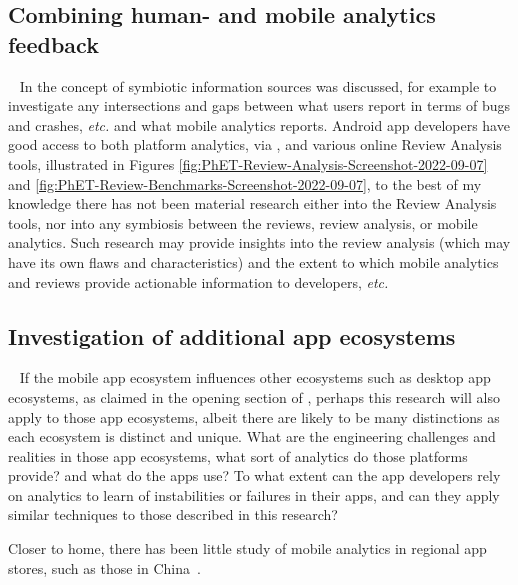 \subsection{Combining human- and mobile analytics feedback}~\label{fw-combining-reviews-and-mobile-analytics-topic}
In  the concept of symbiotic information sources was discussed, for example to investigate any intersections and gaps between what users report in terms of bugs and crashes, \emph{etc.} and what mobile analytics reports. Android app developers have good access to both platform analytics, via , and various online Review Analysis tools, illustrated in Figures \ref{fig:PhET-Review-Analysis-Screenshot-2022-09-07} and \ref{fig:PhET-Review-Benchmarks-Screenshot-2022-09-07}, to the best of my knowledge there has not been material research either into the Review Analysis tools, nor into any symbiosis between the reviews, review analysis, or mobile analytics. Such research may provide insights into the review analysis (which may have its own flaws and characteristics) and the extent to which mobile analytics and reviews provide actionable information to developers, \emph{etc.}


\subsection{Investigation of additional app ecosystems}~\label{fw-investigate-additional-ecosystems}
If the mobile app ecosystem influences other ecosystems such as desktop app ecosystems, as claimed in the opening section of , perhaps this research will also apply to those app ecosystems, albeit there are likely to be many distinctions as each ecosystem is distinct and unique.  What are the engineering challenges and realities in those app ecosystems, what sort of analytics do those platforms provide? and what do the apps use? To what extent can the app developers rely on analytics to learn of instabilities or failures in their apps, and can they apply similar techniques to those described in this research? 

Closer to home, there has been little study of mobile analytics in regional app stores, such as those in China~.


